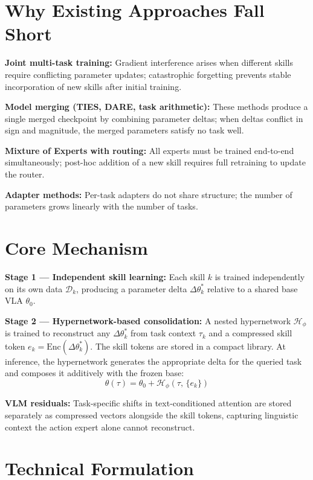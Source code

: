 \documentclass[10pt,twocolumn]{article}
\begin{document}
\section{Why Existing Approaches Fall Short}

\textbf{Joint multi-task training:} Gradient interference arises when
different skills require conflicting parameter updates; catastrophic
forgetting prevents stable incorporation of new skills after initial
training.

\textbf{Model merging (TIES, DARE, task arithmetic):} These methods
produce a single merged checkpoint by combining parameter deltas; when
deltas conflict in sign and magnitude, the merged parameters satisfy no
task well.

\textbf{Mixture of Experts with routing:} All experts must be trained
end-to-end simultaneously; post-hoc addition of a new skill requires
full retraining to update the router.

\textbf{Adapter methods:} Per-task adapters do not share structure;
the number of parameters grows linearly with the number of tasks.

\section{Core Mechanism}

\textbf{Stage 1 --- Independent skill learning:} Each skill $k$ is trained
independently on its own data $\mathcal{D}_k$, producing a parameter delta
$\Delta\theta_k^*$ relative to a shared base VLA $\theta_0$.

\textbf{Stage 2 --- Hypernetwork-based consolidation:} A nested hypernetwork
$\mathcal{H}_\phi$ is trained to reconstruct any $\Delta\theta_k^*$ from
task context $\tau_k$ and a compressed skill token $e_k = \text{Enc}(\Delta\theta_k^*)$.
The skill tokens are stored in a compact library. At inference, the
hypernetwork generates the appropriate delta for the queried task and
composes it additively with the frozen base:
\[
\theta(\tau) = \theta_0 + \mathcal{H}_\phi(\tau,\, \{e_k\})
\]

\textbf{VLM residuals:} Task-specific shifts in text-conditioned attention
are stored separately as compressed vectors alongside the skill tokens,
capturing linguistic context the action expert alone cannot reconstruct.

\section{Technical Formulation}
\end{document}
